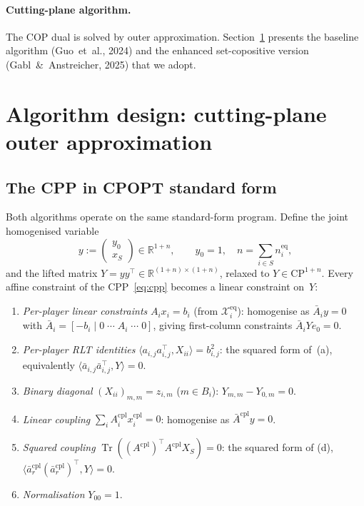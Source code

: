 \documentclass[11pt]{article}
\theoremstyle{definition}
\newcommand{\R}{\mathbb{R}}
\newcommand{\inner}[2]{\langle #1, #2 \rangle}
\newcommand{\Tr}{\operatorname{Tr}}
\newcommand{\xcom}{x^{\mathrm{cpl}}}
\newcommand{\Acom}{A^{\mathrm{cpl}}}
\newcommand{\feaseq}{\mathcal{X}^{\mathrm{eq}}}
\begin{document}
\paragraph{Cutting-plane algorithm.}
The COP dual is solved by outer approximation.
Section~\ref{sec:algorithm} presents the baseline algorithm
(Guo~et~al., 2024) and the enhanced set-copositive version
(Gabl~\&~Anstreicher, 2025) that we adopt.

\section{Algorithm design: cutting-plane outer approximation}
\label{sec:algorithm}

\subsection{The CPP in CPOPT standard form}
\label{sec:cpopt}

Both algorithms operate on the same standard-form program.  Define the
joint homogenised variable
\begin{equation}
y:=\begin{pmatrix}y_0\\x_S\end{pmatrix}\in\R^{1+n},
\qquad y_0=1,\quad n=\textstyle\sum_{i\in S}n_i^{\mathrm{eq}},
\label{eq:homog-y}
\end{equation}
and the lifted matrix $Y=yy^{\top}\in\R^{(1+n)\times(1+n)}$, relaxed
to $Y\in\mathrm{CP}^{1+n}$.  Every affine constraint of the
CPP~\eqref{eq:cpp} becomes a linear constraint on~$Y$:

\begin{enumerate}[label=(\alph*),leftmargin=2em]
\item \emph{Per-player linear constraints}
  $A_ix_i=b_i$ (from $\feaseq_i$): homogenise as
  $\bar A_iy=0$ with $\bar A_i=[-b_i\;|\;0\;\cdots\;A_i\;\cdots\;0]$,
  giving first-column constraints $\bar A_iYe_0=0$.

\item \emph{Per-player RLT identities}
  $\inner{a_{i,j}a_{i,j}^{\top}}{X_{ii}}=b_{i,j}^{2}$: the squared
  form of~(a), equivalently
  $\inner{\bar a_{i,j}\bar a_{i,j}^{\top}}{Y}=0$.

\item \emph{Binary diagonal}
  $(X_{ii})_{m,m}=z_{i,m}$ ($m\in B_i$): $Y_{m,m}-Y_{0,m}=0$.

\item \emph{Linear coupling}
  $\sum_i\Acom_i\xcom_i=0$: homogenise as
  $\bar A^{\mathrm{cpl}}y=0$.

\item \emph{Squared coupling}
  $\Tr((\Acom)^{\top}\Acom X_S)=0$: the squared form of (d),
  $\inner{\bar a^{\mathrm{cpl}}_r(\bar a^{\mathrm{cpl}}_r)^{\top}}{Y}=0$.

\item \emph{Normalisation} $Y_{00}=1$.
\end{enumerate}
\end{document}
